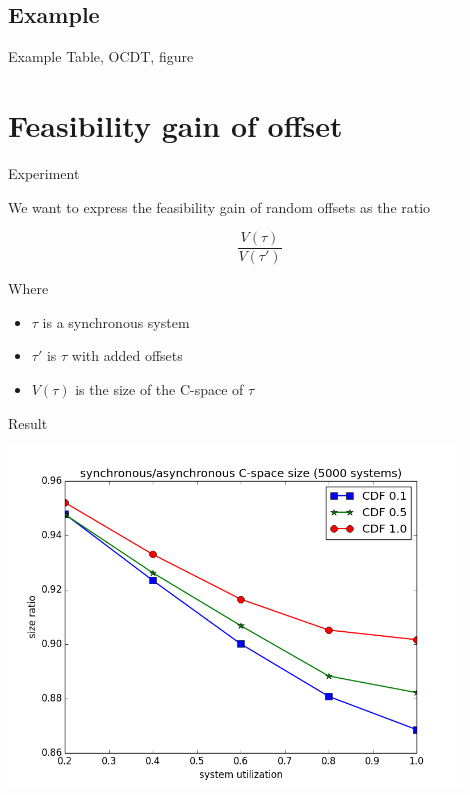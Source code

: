 \documentclass{beamer}
\begin{document}
    \subsection{Example}

    \begin{frame}{Example}
		Table, OCDT, figure
	\end{frame}

\section{Feasibility gain of offset}

    \begin{frame}
    \end{frame}

    \begin{frame}{Experiment}

        We want to express the feasibility gain of random offsets as the ratio

        $$\frac{V(\tau)}{V(\tau')}$$

        Where
        \begin{itemize}
            \item $\tau$ is a synchronous system
            \item $\tau'$ is $\tau$ with added offsets
            \item $V(\tau)$ is the size of the C-space of $\tau$
        \end{itemize}

    \end{frame}

    \begin{frame}{Result}

        \includegraphics[width=0.9\textwidth]{figs/sizeratio.png}

    \end{frame}
\end{document}
